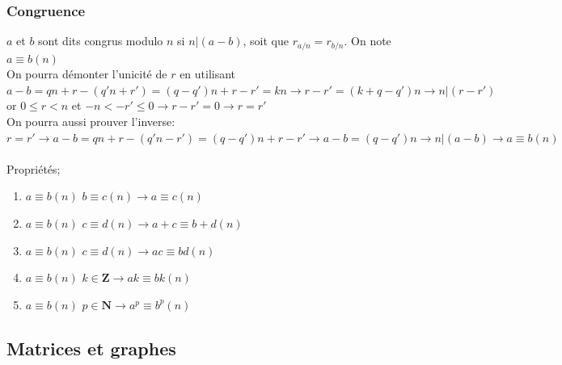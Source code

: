 \documentclass{article}
\begin{document}
\subsubsection{Congruence}
    $a$ et $b$ sont dits congrus modulo $n$ si $n|(a-b)$, soit que $r_{a/n}=r_{b/n}$. On note $a\equiv b (n)$
    \\On pourra démonter l'unicité de $r$ en utilisant $a-b=qn+r-(q'n+r')=(q-q')n+r-r'=kn\rightarrow r-r' = (k+q-q')n \rightarrow n|(r-r') $ or $ 0 \le r < n $ et $ -n<-r'\le 0\rightarrow r-r'=0 \rightarrow r=r'$
    \\On pourra aussi prouver l'inverse: $r=r' \rightarrow a-b=qn+r-(q'n-r')=(q-q')n+r-r' \rightarrow a-b=(q-q')n \rightarrow n|(a-b) \rightarrow a\equiv b(n)$
    \\\\Propriétés;
    \begin{enumerate}
        \item $a \equiv b(n)$ $b\equiv c(n) \rightarrow a\equiv c(n)$
        \item $a \equiv b(n)$ $c \equiv d(n) \rightarrow a+c\equiv b+d(n)$
        \item $a \equiv b(n)$ $c \equiv d(n) \rightarrow ac\equiv bd(n)$
        \item $a \equiv b(n)$ $k\in\mathbf{Z} \rightarrow ak\equiv bk(n)$
        \item $a \equiv b(n)$ $p\in\mathbf{N} \rightarrow a^p\equiv b^p(n)$
    \end{enumerate}


\subsection{Matrices et graphes}
\end{document}
